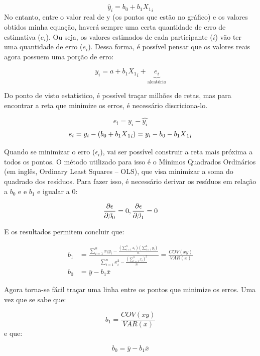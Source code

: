 \documentclass[
]{book}
\begin{document}
\[\hat{y}_i = b_0 + b_1X{_1}_i\]
No entanto, entre o valor real de y (os pontos que estão no gráfico) e os valores obtidos minha equação, haverá sempre uma certa quantidade de erro de estimativa (\(e_i\)). Ou seja, os valores estimados de cada participante (\(i\)) vão ter uma quantidade de erro (\(e_i\)). Dessa forma, é possível pensar que os valores reais agora possuem uma porção de erro:

\[y_i = a + b_1X{_1}_i+\underbrace{e_i}_\text{aleatório}\]

Do ponto de visto estatístico, é possível traçar milhões de retas, mas para encontrar a reta que minimize os erros, é necessário discriciona-lo.

\[e_i = y_i - \hat{y_i}\]
\[e_i = y_i - (b_0 + b_1X{_1}_i) \\ =  y_i - b_0 - b_1X{_1}_i\]

Quando se minimizar o erro (\(\epsilon_{i}\)), vai ser possível construir a reta mais próxima a todos os pontos. O método utilizado para isso é o Mínimos Quadrados Ordinários (em inglês, Ordinary Least Squares -- OLS), que visa minimizar a soma do quadrado dos resíduos. Para fazer isso, é necessário derivar os resíduos em relação a \(b_0\) e e \(b_1\) e igualar a 0:

\[\frac{\partial \epsilon}{\partial \beta_0}  = 0,\\ \frac{\partial \epsilon}{\partial \beta_1} = 0\]

E os resultados permitem concluir que:

\[\begin{aligned}
b_1 &= \frac{\sum_{i = 1}^{n} x_i y_i - \frac{(\sum_{i = 1}^{n} x_i)(\sum_{i = 1}^{n} y_i)}{n}}{\sum_{i = 1}^{n} x_i^2 - \frac{(\sum_{i = 1}^{n} x_i)^2}{n}} = \frac{COV(xy)}{VAR(x)}\\
b_0 &= \bar{y} - b_1 \bar{x}
\end{aligned}\]

Agora torna-se fácil traçar uma linha entre os pontos que minimize os erros. Uma vez que se sabe que:

\[b_1  = \frac{COV(xy)}{VAR(x)}\]
e que:

\[b_0  = \bar{y} - b_1\bar{x}\]
\end{document}
